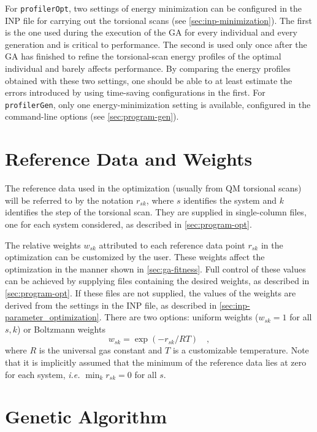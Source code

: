 \documentclass[10pt,a4paper,openany]{memoir}
\numberwithin{equation}{section}
\newcommand{\profileropt}[0]{\texttt{profilerOpt}}
\newcommand{\profilergen}[0]{\texttt{profilerGen}}
\begin{document}
For \profileropt{}, two settings of energy minimization can be
configured in the INP file for carrying out the torsional scans (see
\autoref{sec:inp-minimization}). The first is the one used during the
execution of the GA for every individual and every generation and is
critical to performance.  The second is used only once after the GA
has finished to refine the torsional-scan energy profiles of the
optimal individual and barely affects performance. By comparing the
energy profiles obtained with these two settings, one should be able
to at least estimate the errors introduced by using time-saving
configurations in the first. For \profilergen{}, only one
energy-minimization setting is available, configured in the
command-line options (see \autoref{sec:program-gen}).

\section{Reference Data and Weights}
\label{sec:ga-fitness-wei}

The reference data used in the optimization (usually from QM torsional
scans) will be referred to by the notation $r_{sk}$, where $s$
identifies the system and $k$ identifies the step of the torsional
scan.  They are supplied in single-column files, one for each system
considered, as described in \autoref{sec:program-opt}.

The relative weights $w_{sk}$ attributed to each reference data point
$r_{sk}$ in the optimization can be customized by the user.  These
weights affect the optimization in the manner shown in \autoref{sec:ga-fitness}.
Full control of these values can be achieved by
supplying files containing the desired weights, as described in
\autoref{sec:program-opt}. If these files are not supplied, the values
of the weights are derived from the settings in the INP file, as
described in \autoref{sec:inp-parameter_optimization}.  There are two
options: uniform weights ($w_{sk} = 1$ for all $s,k$) or Boltzmann
weights
\begin{equation*}
  w_{sk} = \exp{(-r_{sk}/RT)} \quad , 
\end{equation*}
where $R$ is the universal gas constant and $T$ is a customizable temperature.
Note that it is implicitly assumed that the minimum of the reference data
lies at zero for each system, \textit{i.e.} $\min_k{r_{sk}} = 0$ for all $s$.

\section{Genetic Algorithm}
\label{sec:ga}
\end{document}
